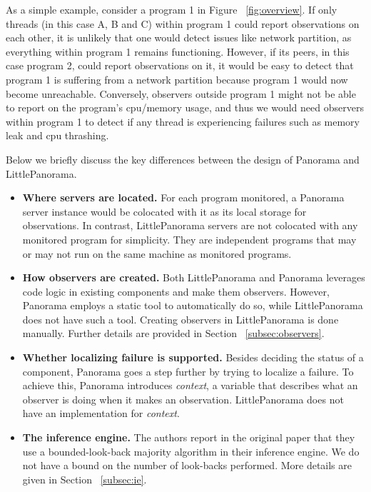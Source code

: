 As a simple example, consider a program 1 in Figure ~\ref{fig:overview}. If only threads (in this case A, B and C) within program 1 could report observations on each other, it is unlikely that one would detect issues like network partition, as everything within program 1 remains functioning. However, if its peers, in this case program 2, could report observations on it, it would be easy to detect that program 1 is suffering from a network partition because program 1 would now become unreachable. Conversely, observers outside program 1 might not be able to report on the program's cpu/memory usage, and thus we would need observers within program 1 to detect if any thread is experiencing failures such as memory leak and cpu thrashing. 

Below we briefly discuss the key differences between the design of Panorama and LittlePanorama. 
\begin{itemize}
    \item \textbf{Where servers are located.} For each program monitored, a Panorama server instance would be colocated with it as its local storage for observations. In contrast, LittlePanorama servers are not colocated with any monitored program for simplicity. They are independent programs that may or may not run on the same machine as monitored programs.
    \item \textbf{How observers are created.} Both LittlePanorama and Panorama leverages code logic in existing components and make them observers. However, Panorama employs a static tool to automatically do so, while LittlePanorama does not have such a tool. Creating observers in LittlePanorama is done manually. Further details are provided in Section ~\ref{subsec:observers}.
    \item \textbf{Whether localizing failure is supported.} Besides deciding the status of a component, Panorama goes a step further by trying to localize a failure. To achieve this, Panorama introduces \textit{context}, a variable that describes what an observer is doing when it makes an observation. LittlePanorama does not have an implementation for \textit{context}.
    \item \textbf{The inference engine.} The authors report in the original paper that they use a bounded-look-back majority algorithm in their inference engine. We do not have a bound on the number of look-backs performed. More details are given in Section ~\ref{subsec:ie}.
\end{itemize}

